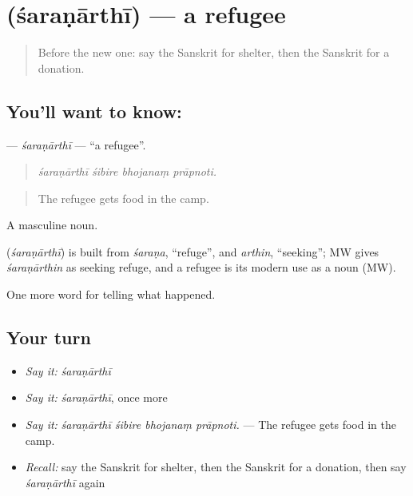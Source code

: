 \section[\texorpdfstring{\sk{शरणार्थी} (śaraṇārthī)}{शरणार्थी (śaraṇārthī)}]{ (śaraṇārthī) — a refugee}

\label{lesson:SA-C306-saranarthi}



\begin{quote}
Before the new one: say the Sanskrit for shelter, then the Sanskrit for a donation.
\end{quote}

\subsection*{You'll want to know: }
\textbf{} — \emph{śaraṇārthī} — \textquotedblleft{}a refugee\textquotedblright{}.

\begin{quote}
   
\end{quote}

\begin{quote}
\emph{śaraṇārthī śibire bhojanaṃ prāpnoti.}
\end{quote}

\begin{quote}
The refugee gets food in the camp.
\end{quote}

A masculine noun.

\begin{cousinweb}
\textbf{} (\emph{śaraṇārthī}) is built from \emph{śaraṇa}, \textquotedblleft{}refuge\textquotedblright{}, and \emph{arthin}, \textquotedblleft{}seeking\textquotedblright{}; MW gives \emph{śaraṇārthin} as seeking refuge, and a refugee is its modern use as a noun (MW).
\end{cousinweb}

\begin{grammarlens}[title={What you've built}]
One more word for telling what happened.
\end{grammarlens}

\subsection*{Your turn}
\begin{itemize}
\raggedright
  \item \emph{Say it:} \emph{śaraṇārthī}
  \item \emph{Say it:} \emph{śaraṇārthī}, once more
  \item \emph{Say it:} \emph{śaraṇārthī śibire bhojanaṃ prāpnoti.} — The refugee gets food in the camp.
  \item \emph{Recall:} say the Sanskrit for shelter, then the Sanskrit for a donation, then say \emph{śaraṇārthī} again
\end{itemize}

